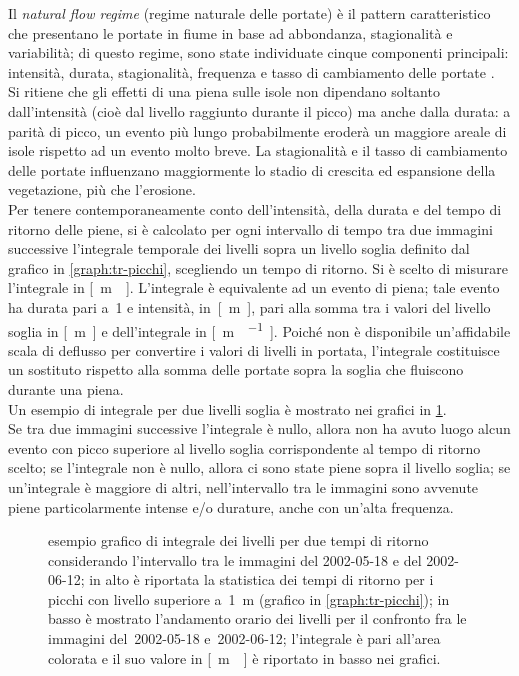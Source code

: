 Il \emph{natural flow regime} (regime naturale delle portate) è il pattern caratteristico che presentano le portate in fiume in base ad abbondanza, stagionalità e variabilità; di questo regime, sono state individuate cinque componenti principali: intensità, durata, stagionalità, frequenza e tasso di cambiamento delle portate .
\\
Si ritiene che gli effetti di una piena sulle isole non dipendano soltanto dall'intensità (cioè dal livello raggiunto durante il picco) ma anche dalla durata: a parità di picco, un evento più lungo probabilmente eroderà un maggiore areale di isole rispetto ad un evento molto breve.
La stagionalità e il tasso di cambiamento delle portate influenzano maggiormente lo stadio di crescita ed espansione della vegetazione, più che l'erosione. 
\\
Per tenere contemporaneamente conto dell'intensità, della durata e del tempo di ritorno delle piene, si è calcolato per ogni intervallo di tempo tra due immagini successive l'integrale temporale dei livelli sopra un livello soglia definito dal grafico in \cref{graph:tr-picchi}, scegliendo un tempo di ritorno.
Si è scelto di misurare l'integrale in \si{[\m\giorno]}.
L'integrale è equivalente ad un evento di piena; tale evento ha durata pari a~\SI{1}{\giorno} e intensità, in~\si{[\m]}, pari alla somma tra i valori del livello soglia in \si{[\m]} e dell'integrale in \si{[\m\giorno\per\giorno]}.
Poiché non è disponibile un'affidabile scala di deflusso per convertire i valori di livelli in portata, l'integrale costituisce un sostituto rispetto alla somma delle portate sopra la soglia che fluiscono durante una piena.
\\
Un esempio di integrale per due livelli soglia è mostrato nei grafici in \cref{graph:esempio-integrale-livelli}.
\\
Se tra due immagini successive l'integrale è nullo, allora non ha avuto luogo alcun evento con picco superiore al livello soglia corrispondente al tempo di ritorno scelto;
se l'integrale non è nullo, allora ci sono state piene sopra il livello soglia;
se un'integrale è maggiore di altri, nell'intervallo tra le immagini sono avvenute piene particolarmente intense e/o durature, anche con un'alta frequenza.
%
\begin{figure}
	\centering
		
	\caption[esempio di integrale dei livelli]{esempio grafico di integrale dei livelli per due tempi di ritorno considerando l'intervallo tra le immagini \AST{} del 2002-05-18 e del 2002-06-12; in alto è riportata la statistica dei tempi di ritorno per i picchi con livello superiore a~\SI{1}{\m} (grafico in \cref{graph:tr-picchi}); in basso è mostrato l'andamento orario dei livelli per il confronto fra le immagini \AST{} del~2002-05-18 e~2002-06-12; l'integrale è pari all'area colorata e il suo valore in \si{[\m\giorno]} è riportato in basso nei grafici.}
	\label{graph:esempio-integrale-livelli}
\end{figure}
%

